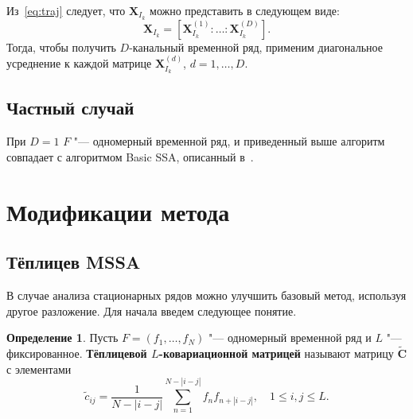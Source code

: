 \documentclass[specialist,
substylefile = spbu_report.rtx,
subf,href,colorlinks=true, 12pt]{disser}
\newcommand{\traj}{\mathbf{X}}
\newcommand{\toeplitz}{\widetilde{\mathbf{C}}}
\theoremstyle{definition}
\newtheorem{definition}{Определение}
\begin{document}
	Из~\eqref{eq:traj} следует, что $\traj_{I_k}$ можно представить в следующем виде:
	\[
	\traj_{I_k}=[\traj^{(1)}_{I_k}:\ldots:\traj^{(D)}_{I_k}].
	\]
	Тогда, чтобы получить $D$-канальный временной ряд, применим диагональное усреднение к каждой матрице $\traj_{I_k}^{(d)}$, $d=1,\ldots,D$.
	\subsection{Частный случай}
	При $D=1$ $F$ "--- одномерный временной ряд, и приведенный выше алгоритм совпадает с алгоритмом Basic SSA, описанный в~\cite{ssa_an}.
	
	\section{Модификации метода}
	\subsection{Тёплицев MSSA}\label{toeplitz}
	В случае анализа стационарных рядов можно улучшить базовый метод, используя другое разложение. Для начала введем следующее понятие.
	
	\begin{definition}
	Пусть $F=(f_1,\ldots,f_N)$ "--- одномерный временной ряд и $L$ "--- фиксированное. \textbf{Тёплицевой $L$-ковариационной матрицей} называют матрицу $\toeplitz$ с элементами
	\[
	\widetilde{c}_{ij}=\frac{1}{N-|i-j|}\sum_{n=1}^{N-|i-j|} f_nf_{n+|i-j|},\quad 1\leqslant i,j \leqslant L.
	\]
	\end{definition}
	
\end{document}
